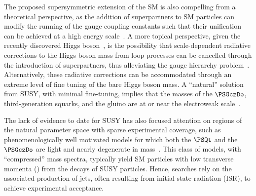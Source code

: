 The proposed supersymmetric extension of the SM is also compelling
from a theoretical perspective, as the addition of superpartners to SM
particles can modify the running of the gauge coupling constants such
that their unification can be achieved at a high energy
scale~\cite{Dimopoulos:1981yj, Ibanez:1981yh, Marciano:1981un}. A more
topical perspective, given the recently discovered Higgs
boson~\cite{ref:atlashiggsdiscovery, ref:cmshiggsdiscovery,
  ref:cmshiggsdiscoverylong}, is the possibility that scale-dependent
radiative corrections to the Higgs boson mass from loop processes can
be cancelled through the introduction of superpartners, thus
alleviating the gauge hierarchy problem~\cite{ref:hierarchy1,
  ref:hierarchy2}. Alternatively, these radiative corrections can be
accommodated through an extreme level of fine tuning of the bare Higgs
boson mass. A ``natural'' solution from SUSY, with minimal
fine-tuning, implies that the masses of the $\PSGczDo$,
third-generation squarks, and the gluino are at or near the
electroweak scale~\cite{ref:barbierinsusy}.

The lack of evidence to date for SUSY has also focused attention on
regions of the natural parameter space with sparse experimental
coverage, such as phenomenologically well motivated models for which
both the $\PSQt$ and the $\PSGczDo$ are light and nearly degenerate in
mass~\cite{Boehm:1999bj, Boehm:1999tr, Balazs:2004bu, Martin:2007gf,
  Martin:2007hn, Carena:2008mj, Delgado:2012eu, Grober:2014aha,
  Grober:2015fia}. This class of models, with ``compressed'' mass
spectra, typically yield SM particles with low transverse momenta
(\pt) from the decays of SUSY particles. Hence, searches rely on the
associated production of jets, often resulting from initial-state
radiation (ISR), to achieve experimental acceptance.

